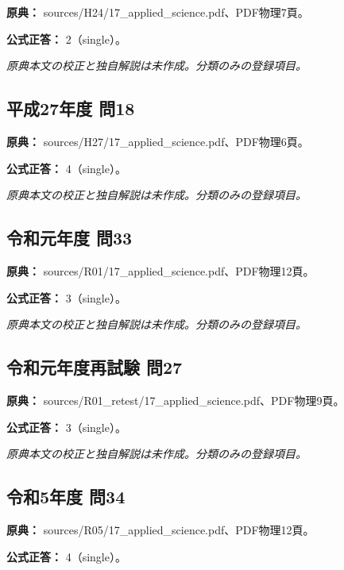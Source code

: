 \noindent\textbf{原典：} sources/H24/17\_applied\_science.pdf、PDF物理7頁。

\textbf{公式正答：} 2（single）。

\par\textit{原典本文の校正と独自解説は未作成。分類のみの登録項目。}

\subsection{平成27年度 問18}
\label{q:h27-reg-applied-18}

\noindent\textbf{原典：} sources/H27/17\_applied\_science.pdf、PDF物理6頁。

\textbf{公式正答：} 4（single）。

\par\textit{原典本文の校正と独自解説は未作成。分類のみの登録項目。}

\subsection{令和元年度 問33}
\label{q:r01-reg-applied-33}

\noindent\textbf{原典：} sources/R01/17\_applied\_science.pdf、PDF物理12頁。

\textbf{公式正答：} 3（single）。

\par\textit{原典本文の校正と独自解説は未作成。分類のみの登録項目。}

\subsection{令和元年度再試験 問27}
\label{q:r01-ret-applied-27}

\noindent\textbf{原典：} sources/R01\_retest/17\_applied\_science.pdf、PDF物理9頁。

\textbf{公式正答：} 3（single）。

\par\textit{原典本文の校正と独自解説は未作成。分類のみの登録項目。}

\subsection{令和5年度 問34}
\label{q:r05-reg-applied-34}

\noindent\textbf{原典：} sources/R05/17\_applied\_science.pdf、PDF物理12頁。

\textbf{公式正答：} 4（single）。

